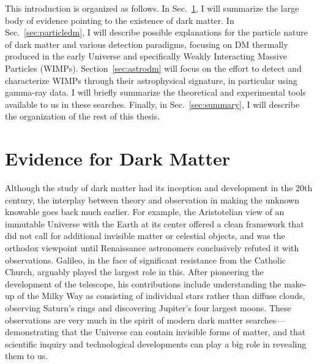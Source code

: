 This introduction is organized as follows. In Sec.~\ref{sec:evidence}, I will summarize the large body of evidence pointing to the existence of dark matter. In Sec.~\ref{sec:particledm}, I will describe possible explanations for the particle nature of dark matter and various detection paradigms, focusing on DM thermally produced in the early Universe and specifically Weakly Interacting Massive Particles (WIMPs). Section~\ref{sec:astrodm} will focus on the effort to detect and characterize WIMPs through their astrophysical signature, in particular using gamma-ray data. I will briefly summarize the theoretical and experimental tools available to us in these searches. Finally, in Sec.~\ref{sec:summary}, I will describe the organization of the rest of this thesis. %

\section{Evidence for Dark Matter}
\label{sec:evidence}

Although the study of dark matter had its inception and development in the 20th century, the interplay between theory and observation in making the unknown knowable goes back much earlier. For example, the Aristotelian view of an immutable Universe with the Earth at its center offered a clean framework that did not call for additional invisible matter or celestial objects, and was the orthodox viewpoint until Renaissance astronomers conclusively refuted it with observations. Galileo, in the face of significant resistance from the Catholic Church, arguably played the largest role in this. After pioneering the development of the telescope, his contributions include understanding the make-up of the Milky Way as consisting of individual stars rather than diffuse clouds, observing Saturn's rings and discovering Jupiter's four largest moons. These observations are very much in the spirit of modern dark matter searches---demonstrating that the Universe can contain invisible forms of matter, and that scientific inquiry and technological developments can play a big role in revealing them to us.


